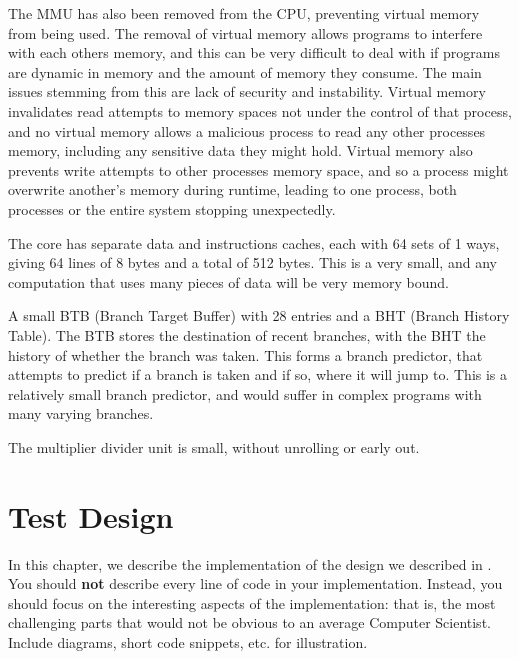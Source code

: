 The MMU has also been removed from the CPU, preventing virtual memory from being used. The removal of virtual memory allows programs to interfere with each others memory, and this can be very difficult to deal with if programs are dynamic in memory and the amount of memory they consume. The main issues stemming from this are lack of security and instability. Virtual memory invalidates read attempts to memory spaces not under the control of that process, and no virtual memory allows a malicious process to read any other processes memory, including any sensitive data they might hold. Virtual memory also prevents write attempts to other processes memory space, and so a process might overwrite another's memory during runtime, leading to one process, both processes or the entire system stopping unexpectedly.

The core has separate data and instructions caches, each with 64 sets of 1 ways, giving 64 lines of 8 bytes and a total of 512 bytes. This is a very small, and any computation that uses many pieces of data will be very memory bound.

A small BTB (Branch Target Buffer) with 28 entries and a BHT (Branch History Table). The BTB stores the destination of recent branches, with the BHT the history of whether the branch was taken. This forms a branch predictor, that attempts to predict if a branch is taken and if so, where it will jump to. This is a relatively small branch predictor, and would suffer in complex programs with many varying branches.

The multiplier divider unit is small, without unrolling or early out.

\chapter{Test Design}
\label{ch:test_design}

In this chapter, we describe the implementation of the design we described in . You should \textbf{not} describe every line of code in your implementation. Instead, you should focus on the interesting aspects of the implementation: that is, the most challenging parts that would not be obvious to an average Computer Scientist. Include diagrams, short code snippets, etc. for illustration.